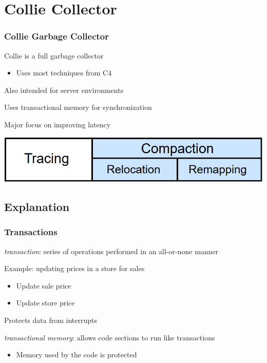 \documentclass{beamer}
\newcommand{\linespace}{\vskip 0.25cm}
\begin{document}
\section[Collie]{Collie Collector}

\begin{frame}

\frametitle{Collie Garbage Collector}

Collie is a full garbage collector
\begin{itemize}
\item Uses most techniques from C4
\end{itemize}

\linespace

Also intended for server environments

\linespace

Uses transactional memory for synchronization

\linespace

Major focus on improving latency

\linespace
\linespace
\linespace

\begin{center}
\includegraphics[width=.85\textwidth]{Illustrations/gc_cycle_locator_compaction.png}
\end{center}

\end{frame}



\subsection*{Explanation}

\begin{frame}

\frametitle{Transactions}

\emph{transaction}: series of operations performed in an all-or-none manner

\linespace
\linespace

Example: updating prices in a store for sales \\
\begin{itemize}
\item Update sale price
\item Update store price
\end{itemize}

\linespace
\linespace

Protects data from interrupts

\linespace
\linespace

\emph{transactional memory}: allows code sections to run like transactions
\begin{itemize}
\item Memory used by the code is protected
\end{itemize}

\end{frame}
\end{document}

